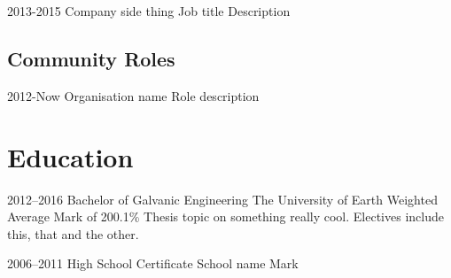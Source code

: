 \documentclass[a4paper,english]{friggeri-cv} %
\begin{document}
\begin{entrylist}


\entry
{2013-2015}
{Company} 
{side thing}
{Job title}
{ 
Description
}




\end{entrylist}




\subsection{Community Roles}

\begin{entrylist}


\entry
{2012-Now}
{Organisation name} 
{}
{Role}
{
description
}




\end{entrylist}


\section{Education}

\begin{entrylist} 


\entry
{2012--2016}
{Bachelor {\normalfont of Galvanic Engineering}}
{The University of Earth}
{Weighted Average Mark of 200.1\%}
{
Thesis topic on something really cool. Electives include this, that and the other.
}


\entry
{2006--2011}  
{High School Certificate}
{School name}
{Mark} 
{
}


\end{entrylist}

\end{document}
